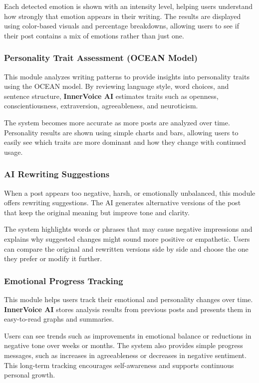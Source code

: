 \documentclass[12pt,a4paper]{report}
\begin{document}
Each detected emotion is shown with an intensity level, helping users understand how strongly that emotion appears in their writing. The results are displayed using color-based visuals and percentage breakdowns, allowing users to see if their post contains a mix of emotions rather than just one.

\subsubsection{Personality Trait Assessment (OCEAN Model)}

This module analyzes writing patterns to provide insights into personality traits using the OCEAN model. By reviewing language style, word choices, and sentence structure, \textbf{InnerVoice AI} estimates traits such as openness, conscientiousness, extraversion, agreeableness, and neuroticism.

The system becomes more accurate as more posts are analyzed over time. Personality results are shown using simple charts and bars, allowing users to easily see which traits are more dominant and how they change with continued usage.

\subsubsection{AI Rewriting Suggestions}

When a post appears too negative, harsh, or emotionally unbalanced, this module offers rewriting suggestions. The AI generates alternative versions of the post that keep the original meaning but improve tone and clarity.

The system highlights words or phrases that may cause negative impressions and explains why suggested changes might sound more positive or empathetic. Users can compare the original and rewritten versions side by side and choose the one they prefer or modify it further.

\subsubsection{Emotional Progress Tracking}

This module helps users track their emotional and personality changes over time. \textbf{InnerVoice AI} stores analysis results from previous posts and presents them in easy-to-read graphs and summaries.

Users can see trends such as improvements in emotional balance or reductions in negative tone over weeks or months. The system also provides simple progress messages, such as increases in agreeableness or decreases in negative sentiment. This long-term tracking encourages self-awareness and supports continuous personal growth.
\end{document}
